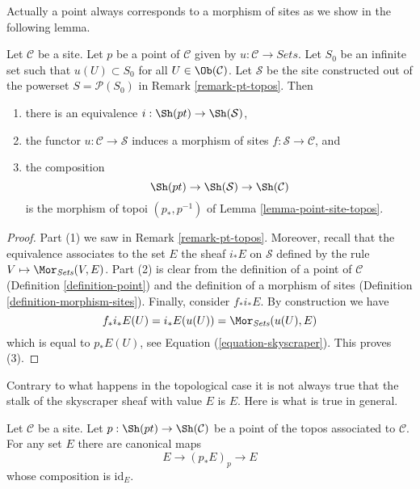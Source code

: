 \noindent
Actually a point always corresponds to a morphism of sites as we
show in the following lemma.

\begin{lemma}
\label{lemma-site-point-morphism}
Let $\mathcal{C}$ be a site. Let $p$ be a point of $\mathcal{C}$ given by
$u : \mathcal{C} \to \textit{Sets}$. Let $S_0$ be an infinite set such that
$u(U) \subset S_0$ for all $U \in \Ob(\mathcal{C})$. Let $\mathcal{S}$
be the site constructed out of the powerset $S = \mathcal{P}(S_0)$ in
Remark \ref{remark-pt-topos}.
Then
\begin{enumerate}
\item there is an equivalence
$i : \Sh(pt) \to \Sh(\mathcal{S})$,
\item the functor $u : \mathcal{C} \to \mathcal{S}$ induces a morphism of
sites $f : \mathcal{S} \to \mathcal{C}$, and
\item the composition
$$
\Sh(pt) \to
\Sh(\mathcal{S}) \to
\Sh(\mathcal{C})
$$
is the morphism of topoi $(p_*, p^{-1})$ of
Lemma \ref{lemma-point-site-topos}.
\end{enumerate}
\end{lemma}

\begin{proof}
Part (1) we saw in
Remark \ref{remark-pt-topos}.
Moreover, recall that the equivalence associates to the set $E$
the sheaf $i_*E$ on $\mathcal{S}$ defined by the rule
$V \mapsto \Mor_{\textit{Sets}}(V, E)$.
Part (2) is clear from the definition of a point of $\mathcal{C}$
(Definition \ref{definition-point})
and the definition of a morphism of sites
(Definition \ref{definition-morphism-sites}).
Finally, consider $f_*i_*E$. By construction we have
$$
f_*i_*E(U) = i_*E(u(U)) = \Mor_{\textit{Sets}}(u(U), E)
$$
which is equal to $p_*E(U)$, see
Equation (\ref{equation-skyscraper}).
This proves (3).
\end{proof}

\noindent
Contrary to what happens in the topological case it is not always
true that the stalk of the skyscraper sheaf with value $E$ is $E$.
Here is what is true in general.

\begin{lemma}
\label{lemma-stalk-skyscraper}
Let $\mathcal{C}$ be a site. Let
$p : \Sh(pt) \to \Sh(\mathcal{C})$ be a point of
the topos associated to $\mathcal{C}$.
For any set $E$ there are canonical maps
$$
E \longrightarrow (p_*E)_p \longrightarrow E
$$
whose composition is $\text{id}_E$.
\end{lemma}

